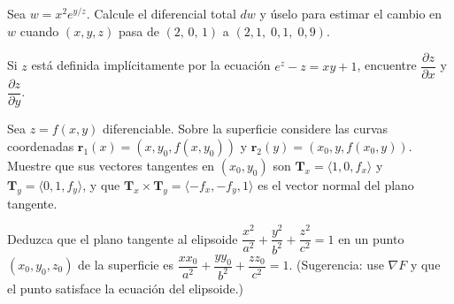 \begin{prob}
Sea $w=x^2 e^{y/z}$. Calcule el diferencial total $dw$ y úselo para estimar el cambio
en $w$ cuando $(x,y,z)$ pasa de $(2,\,0,\,1)$ a $(2{,}1,\;0{,}1,\;0{,}9)$.
\end{prob}

\begin{prob}
Si $z$ está definida implícitamente por la ecuación $e^z-z=xy+1$,
encuentre $\dfrac{\partial z}{\partial x}$ y $\dfrac{\partial z}{\partial y}$.
\end{prob}

\begin{prob}
Sea $z=f(x,y)$ diferenciable. Sobre la superficie considere las curvas
coordenadas $\mathbf r_1(x)=(x,y_0,f(x,y_0))$ y $\mathbf r_2(y)=(x_0,y,f(x_0,y))$.
Muestre que sus vectores tangentes en $(x_0,y_0)$ son
$\mathbf T_x=\langle 1,0,f_x\rangle$ y $\mathbf T_y=\langle 0,1,f_y\rangle$, y que
$\mathbf T_x\times\mathbf T_y=\langle -f_x,-f_y,1\rangle$ es el vector normal del
plano tangente.
\end{prob}

\begin{prob}
Deduzca que el plano tangente al elipsoide
$\dfrac{x^2}{a^2}+\dfrac{y^2}{b^2}+\dfrac{z^2}{c^2}=1$ en un punto
$(x_0,y_0,z_0)$ de la superficie es
$\dfrac{x x_0}{a^2}+\dfrac{y y_0}{b^2}+\dfrac{z z_0}{c^2}=1$.
(Sugerencia: use $\nabla F$ y que el punto satisface la ecuación del elipsoide.)
\end{prob}

